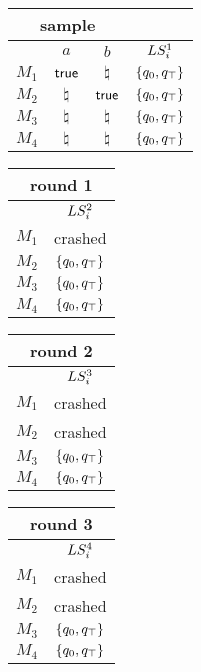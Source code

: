 \begin{tabular}{| c |c |c |c|}
\multicolumn{3}{c}{sample} \\
\hline
&$a$&$b$&$LS_i^1$\\
\hline
$M_1$ & $\mathsf{true}$  & $\natural$ & $\{q_0, q_\top\}$\\
$M_2$ & $\natural$ & $\mathsf{true}$ &  $\{q_0, q_\top\}$\\
$M_3$ & $\natural$ & $\natural$ &  $\{q_0, q_\top\}$ \\
$M_4$ & $\natural$ & $\natural$ &  $\{q_0, q_\top\}$\\
\hline
\end{tabular} 
\quad
\begin{tabular}{| c |c|}
\multicolumn{2}{c}{round 1} \\
\hline
&$LS_i^2$\\
\hline
$M_1$ & crashed\\
$M_2$ & $\{q_0, q_\top\}$\\
$M_3$ & $\{q_0, q_\top\}$ \\
$M_4$ & $\{q_0, q_\top\}$ \\
\hline
\end{tabular}
\quad
\begin{tabular}{| c |c|}
\multicolumn{2}{c}{round 2} \\
\hline
&$LS_i^3$\\
\hline
$M_1$ & crashed\\
$M_2$ & crashed\\
$M_3$ & $\{q_0, q_\top\}$ \\
$M_4$ & $\{q_0, q_\top\}$ \\
\hline
\end{tabular}
\quad
\begin{tabular}{| c |c|}
\multicolumn{2}{c}{round 3} \\
\hline
&$LS_i^4$\\
\hline
$M_1$ & crashed\\
$M_2$ & crashed\\
$M_3$ & $\{q_0, q_\top\}$ \\
$M_4$ & $\{q_0, q_\top\}$ \\
\hline
\end{tabular} \\ \\


